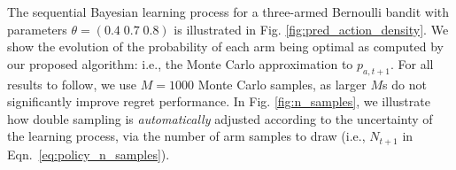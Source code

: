 \documentclass{article}
\newcommand{\ie}{i.e., }
\begin{document}

The sequential Bayesian learning process for a three-armed Bernoulli bandit with parameters $\theta=\left(0.4 \; 0.7 \; 0.8 \right)$ is illustrated in Fig. \ref{fig:pred_action_density}. We show the evolution of the probability of each arm being optimal as computed by our proposed algorithm: \ie the Monte Carlo approximation to $p_{a,t+1}$. For all results to follow, we use $M=1000$ Monte Carlo samples, as larger $M$s do not significantly improve regret performance. In Fig. \ref{fig:n_samples}, we illustrate how double sampling is {\em automatically} adjusted according to the uncertainty of the learning process, via the number of arm samples to draw (\ie $N_{t+1}$ in Eqn.~\eqref{eq:policy_n_samples}).
\end{document}
